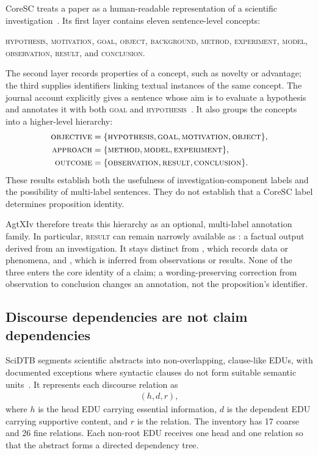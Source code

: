 CoreSC treats a paper as a human-readable representation of a scientific investigation~\cite{liakata2010coresc,liakata2012coresc}. Its first layer contains eleven sentence-level concepts:
\begin{center}
\textsc{hypothesis}, \textsc{motivation}, \textsc{goal}, \textsc{object}, \textsc{background},
\textsc{method}, \textsc{experiment}, \textsc{model}, \textsc{observation}, \textsc{result}, and \textsc{conclusion}.
\end{center}
The second layer records properties of a concept, such as novelty or advantage; the third supplies identifiers linking textual instances of the same concept. The journal account explicitly gives a sentence whose aim is to evaluate a hypothesis and annotates it with both \textsc{goal} and \textsc{hypothesis}~\cite{liakata2012coresc}. It also groups the concepts into a higher-level hierarchy:
\begin{align*}
\textsc{objective} &= \{\textsc{hypothesis},\textsc{goal},\textsc{motivation},\textsc{object}\},\\
\textsc{approach} &= \{\textsc{method},\textsc{model},\textsc{experiment}\},\\
\textsc{outcome} &= \{\textsc{observation},\textsc{result},\textsc{conclusion}\}.
\end{align*}
These results establish both the usefulness of investigation-component labels and the possibility of multi-label sentences. They do not establish that a CoreSC label determines proposition identity.

AgtXIv therefore treats this hierarchy as an optional, multi-label annotation family. In particular, \textsc{result} can remain narrowly available as : a factual output derived from an investigation. It stays distinct from , which records data or phenomena, and , which is inferred from observations or results. None of the three enters the core identity of a claim; a wording-preserving correction from observation to conclusion changes an annotation, not the proposition's identifier.

\subsection{Discourse dependencies are not claim dependencies}

SciDTB segments scientific abstracts into non-overlapping, clause-like EDUs, with documented exceptions where syntactic clauses do not form suitable semantic units~\cite{yang2018scidtb}. It represents each discourse relation as
\begin{align*}
(h,d,r),
\end{align*}
where $h$ is the head EDU carrying essential information, $d$ is the dependent EDU carrying supportive content, and $r$ is the relation. The inventory has 17 coarse and 26 fine relations. Each non-root EDU receives one head and one relation so that the abstract forms a directed dependency tree.

